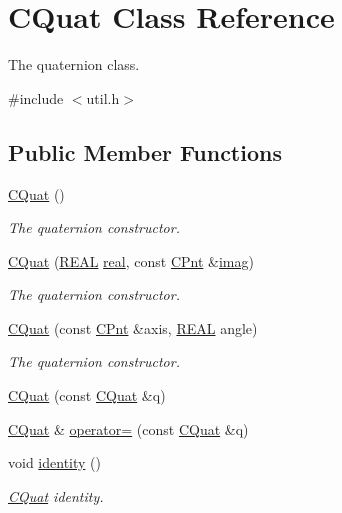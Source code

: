 \hypertarget{classCQuat}{\section{C\-Quat Class Reference}
\label{classCQuat}
}


The quaternion class.  




{\ttfamily \#include $<$util.\-h$>$}

\subsection*{Public Member Functions}
\begin{DoxyCompactItemize}
\item 
\hyperlink{classCQuat_aa8497e624cd8c83814ee708beed80be8}{C\-Quat} ()
\begin{DoxyCompactList}\small\item\em The quaternion constructor. \end{DoxyCompactList}\item 
\hyperlink{classCQuat_a9e2eb21a9c7ec78d94e0fe38e34b242b}{C\-Quat} (\hyperlink{util_8h_a5821460e95a0800cf9f24c38915cbbde}{R\-E\-A\-L} \hyperlink{classCQuat_a7f18efa604d788a39bb6726de6546ce2}{real}, const \hyperlink{classCPnt}{C\-Pnt} \&\hyperlink{classCQuat_a783b34fbc307fbb00fd112c8441b0f30}{imag})
\begin{DoxyCompactList}\small\item\em The quaternion constructor. \end{DoxyCompactList}\item 
\hyperlink{classCQuat_a5225432b6d2298207cadd596073a500c}{C\-Quat} (const \hyperlink{classCPnt}{C\-Pnt} \&axis, \hyperlink{util_8h_a5821460e95a0800cf9f24c38915cbbde}{R\-E\-A\-L} angle)
\begin{DoxyCompactList}\small\item\em The quaternion constructor. \end{DoxyCompactList}\item 
\hyperlink{classCQuat_acd11b75e7090f6a6992425bcc5416219}{C\-Quat} (const \hyperlink{classCQuat}{C\-Quat} \&q)
\item 
\hyperlink{classCQuat}{C\-Quat} \& \hyperlink{classCQuat_ad7a24172721a059adcbf40f6db7584fb}{operator=} (const \hyperlink{classCQuat}{C\-Quat} \&q)
\item 
void \hyperlink{classCQuat_a9a0a307a7660ba46e1587b67f5cc35ea}{identity} ()
\begin{DoxyCompactList}\small\item\em \hyperlink{classCQuat}{C\-Quat} identity. \end{DoxyCompactList}\item 

\end{DoxyCompactItemize}
